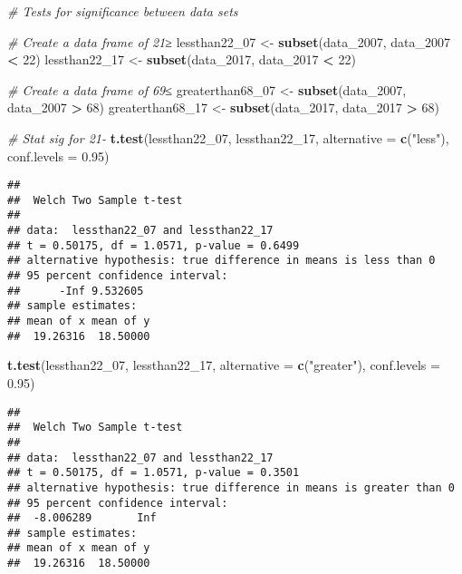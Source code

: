 \documentclass[
]{article}
\newenvironment{Shaded}{\begin{snugshade}}{\end{snugshade}}
\newcommand{\AttributeTok}[1]{\textcolor[rgb]{0.13,0.29,0.53}{#1}}
\newcommand{\CommentTok}[1]{\textcolor[rgb]{0.56,0.35,0.01}{\textit{#1}}}
\newcommand{\DecValTok}[1]{\textcolor[rgb]{0.00,0.00,0.81}{#1}}
\newcommand{\FloatTok}[1]{\textcolor[rgb]{0.00,0.00,0.81}{#1}}
\newcommand{\FunctionTok}[1]{\textcolor[rgb]{0.13,0.29,0.53}{\textbf{#1}}}
\newcommand{\NormalTok}[1]{#1}
\newcommand{\OtherTok}[1]{\textcolor[rgb]{0.56,0.35,0.01}{#1}}
\newcommand{\SpecialCharTok}[1]{\textcolor[rgb]{0.81,0.36,0.00}{\textbf{#1}}}
\newcommand{\StringTok}[1]{\textcolor[rgb]{0.31,0.60,0.02}{#1}}
\begin{document}
\begin{Shaded}
\begin{Highlighting}[]
\CommentTok{\# Tests for significance between data sets}

\CommentTok{\# Create a data frame of 21≥}
\NormalTok{lessthan22\_07 }\OtherTok{\textless{}{-}} \FunctionTok{subset}\NormalTok{(data\_2007, data\_2007 }\SpecialCharTok{\textless{}} \DecValTok{22}\NormalTok{)}
\NormalTok{lessthan22\_17 }\OtherTok{\textless{}{-}} \FunctionTok{subset}\NormalTok{(data\_2017, data\_2017 }\SpecialCharTok{\textless{}} \DecValTok{22}\NormalTok{)}

\CommentTok{\# Create a data frame of 69≤}
\NormalTok{greaterthan68\_07 }\OtherTok{\textless{}{-}} \FunctionTok{subset}\NormalTok{(data\_2007, data\_2007 }\SpecialCharTok{\textgreater{}} \DecValTok{68}\NormalTok{)}
\NormalTok{greaterthan68\_17 }\OtherTok{\textless{}{-}} \FunctionTok{subset}\NormalTok{(data\_2017, data\_2017 }\SpecialCharTok{\textgreater{}} \DecValTok{68}\NormalTok{)}

\CommentTok{\# Stat sig for 21{-}}
\FunctionTok{t.test}\NormalTok{(lessthan22\_07, lessthan22\_17, }\AttributeTok{alternative =} \FunctionTok{c}\NormalTok{(}\StringTok{"less"}\NormalTok{),}
       \AttributeTok{conf.levels =} \FloatTok{0.95}\NormalTok{)}
\end{Highlighting}
\end{Shaded}

\begin{verbatim}
## 
##  Welch Two Sample t-test
## 
## data:  lessthan22_07 and lessthan22_17
## t = 0.50175, df = 1.0571, p-value = 0.6499
## alternative hypothesis: true difference in means is less than 0
## 95 percent confidence interval:
##      -Inf 9.532605
## sample estimates:
## mean of x mean of y 
##  19.26316  18.50000
\end{verbatim}

\begin{Shaded}
\begin{Highlighting}[]
\FunctionTok{t.test}\NormalTok{(lessthan22\_07, lessthan22\_17, }\AttributeTok{alternative =} \FunctionTok{c}\NormalTok{(}\StringTok{"greater"}\NormalTok{),}
       \AttributeTok{conf.levels =} \FloatTok{0.95}\NormalTok{)}
\end{Highlighting}
\end{Shaded}

\begin{verbatim}
## 
##  Welch Two Sample t-test
## 
## data:  lessthan22_07 and lessthan22_17
## t = 0.50175, df = 1.0571, p-value = 0.3501
## alternative hypothesis: true difference in means is greater than 0
## 95 percent confidence interval:
##  -8.006289       Inf
## sample estimates:
## mean of x mean of y 
##  19.26316  18.50000
\end{verbatim}
\end{document}
